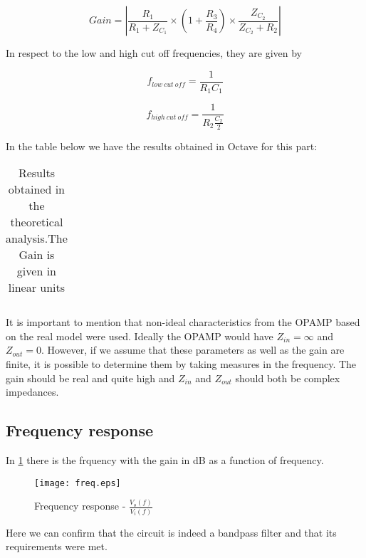 \begin{equation}
Gain = \left| \frac{R_1}{R_1 + Z_{C_1}} \times  \left(1+\frac{R_3}{R_4}\right) \times \frac{Z_{C_2}}{Z_{C_2}+R_2} \right|
\end{equation}



In respect to the low and high cut off frequencies, they are given by 

\begin{equation}
f_{low \ cut \ off} = \frac{1}{R_1 C_1}
\end{equation}

\begin{equation}
f_{high \ cut \ off} = \frac{1}{R_2 \frac {C_2}{2}}
\end{equation}

In the table below we have the results obtained in Octave for this part:

\begin{table}[H]
  \centering
  \begin{tabular}{|c|c|}
    \hline
      
  \end{tabular}
  \caption{Results obtained in the theoretical analysis.The Gain is given in linear units}
  \label{tab:results}
\end{table}

It is important to mention that non-ideal characteristics from the OPAMP based on the real model were used. Ideally the OPAMP would have $Z_{in} = \infty$ and $Z_{out} = 0$. However, if we assume that these parameters as well as the gain are finite, it is possible to determine them by taking measures in the frequency. The gain should be real and quite high and $Z_{in}$ and $Z_{out}$ should both be complex impedances.




\subsection{Frequency response}

In \ref{fig:freq_response} there is the frquency with the gain in dB as a function of frequency.


\begin{figure}[H] \centering
\texttt{[image: freq.eps]}
\caption{Frequency response - $\frac{V_o(f)}{V_i(f)}$}
\label{fig:freq_response}
\end{figure}

Here we can confirm that the circuit is indeed a bandpass filter and that its requirements were met. 




